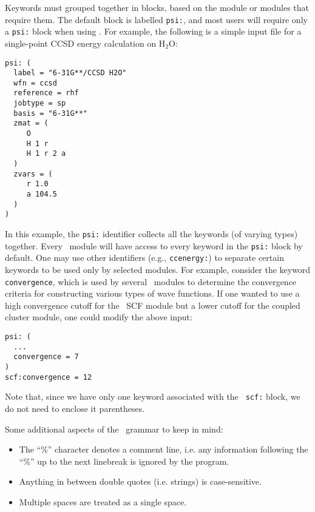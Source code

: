 Keywords must grouped together in blocks, based on the module or
modules that require them.  The default block is labelled {\tt psi:},
and most users will require only a {\tt psi:} block when using
\PSIthree.  For example, the following is a simple input file for a
single-point CCSD energy calculation on H$_2$O:
\begin{verbatim}
psi: (
  label = "6-31G**/CCSD H2O"
  wfn = ccsd
  reference = rhf
  jobtype = sp
  basis = "6-31G**"
  zmat = (
     O
     H 1 r 
     H 1 r 2 a 
  )
  zvars = (
     r 1.0 
     a 104.5 
  )
)
\end{verbatim}
In this example, the {\tt psi:} identifier collects all the keywords
(of varying types) together.  Every \PSIthree\ module will have access
to every keyword in the {\tt psi:} block by default.  One may use
other identifiers (e.g., {\tt ccenergy:}) to separate certain keywords
to be used only by selected modules.  For example, consider the
keyword {\tt convergence}, which is used by several \PSIthree\ modules
to determine the convergence criteria for constructing various types
of wave functions.  If one wanted to use a high convergence cutoff for the
\PSIthree\ SCF module but a lower cutoff for the coupled cluster
module, one could modify the above input:
\begin{verbatim}
psi: (
  ...
  convergence = 7
)
scf:convergence = 12
\end{verbatim}
Note that, since we have only one keyword associated with the {\tt
  scf:} block, we do not need to enclose it parentheses.

Some additional aspects of the \PSIthree\ grammar to keep in mind:
\begin{itemize}
\item The ``\%'' character denotes a comment line, i.e. any
  information following the ``\%'' up to the next linebreak is ignored
  by the program.
\item Anything in between double quotes (i.e. strings) is case-sensitive.
\item Multiple spaces are treated as a single space.
\end{itemize}


